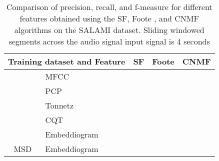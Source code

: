 \begin{table}
  \centering
  \begin{adjustbox}{width=\textwidth}
  \begin{threeparttable}
    \begin{tabular}{c|l|c|c|c} 
\toprule
     \multicolumn{2}{c|}{\textbf{Training dataset} and \textbf{Feature}}  & \multicolumn{1}{c}{\textbf{SF}} & \multicolumn{1}{c}{\textbf{Foote}} & \multicolumn{1}{c}{\textbf{CNMF}} 
     \\ \midrule 
    \multirow{5}{*}{}&   
         \multirow{1}{*}{MFCC } & \usebox{\mfccSF} & \usebox{\mfccFoote} & \usebox{\mfccCNMF} \\\cline{2-5}
        & \multirow{1}{*}{PCP} & \usebox{\pcpSF} & \usebox{\pcpFoote} & \usebox{\pcpCNMF} \\\cline{2-5}
        & \multirow{1}{*}{Tonnetz} & \usebox{\tonnetzSF} & \usebox{\tonnetzFoote} & \usebox{\tonnetzCNMF} \\\cline{2-5} 
        & \multirow{1}{*}{CQT} & \usebox{\cqtSF} & \usebox{\cqtFoote} & \usebox{\cqtCNMF} \\\cline{1-5} 
    \multirow{1}{*}{GTZAN \cite{GTZAN}}& 
        \multirow{1}{*}{Embeddiogram} & \usebox{\embeddioaSF} & \usebox{\embeddioaFoote} & \usebox{\embeddioaCNMF} \\\cline{1-5} 
    \multirow{1}{*}{MSD \cite{MSD}}& 
        \multirow{1}{*}{Embeddiogram} & \usebox{\embeddiobSF} & \usebox{\embeddiobFoote} & \usebox{\embeddiobCNMF} \\\bottomrule
    \end{tabular}
    \caption[Metric comparison: audio features and segmentation algorithms]{Comparison of precision, recall, and f-measure for different features obtained using the SF\cite{sf}, Foote \cite{Foote2000AutomaticNovelty}, and CNMF \cite{NietoCONVEXIDENTIFICATION} algorithms on the SALAMI dataset. Sliding windowed segments across the audio signal input signal is 4 seconds}\label{ta:results}
  \end{threeparttable}
  \end{adjustbox}
\end{table}




